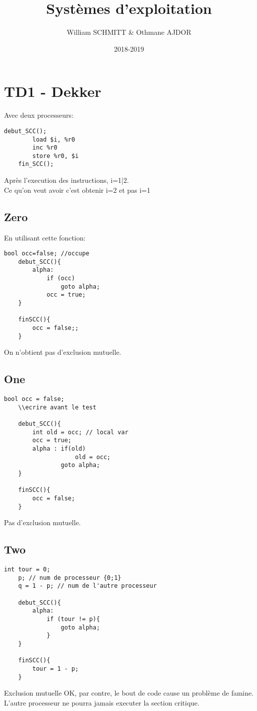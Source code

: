 \documentclass[11pt]{article}
\title{Systèmes d'exploitation}
\author{William SCHMITT \& Othmane AJDOR}
\date{2018-2019}
\begin{document}
\maketitle

\section{TD1 - Dekker}
Avec deux processeurs:
\begin{lstlisting}[frame=single]
	debut_SCC();
		load $i, %r0
		inc %r0
		store %r0, $i
	fin_SCC();
\end{lstlisting}
Après l'execution des instructions, i=1|2.\\
Ce qu'on veut avoir c'est obtenir i=2 et pas i=1

\subsection{Zero}
En utilisant cette fonction:
\begin{lstlisting}[frame=single]
	bool occ=false; //occupe
	debut_SCC(){
		alpha: 
			if (occ) 
				goto alpha; 
			occ = true;
	}

	finSCC(){
		occ = false;;
	}
\end{lstlisting}
On n'obtient pas d'exclusion mutuelle.

\pagebreak

\subsection{One}
\begin{lstlisting}[frame=single]
	bool occ = false;
	\\ecrire avant le test
	
	debut_SCC(){
		int old = occ; // local var
		occ = true;
		alpha : if(old)
					old = occ;
				goto alpha;
	}

	finSCC(){
		occ = false;
	}
\end{lstlisting}
Pas d'exclusion mutuelle.

\subsection{Two}
\begin{lstlisting}[frame=single]
	int tour = 0;
	p; // num de processeur {0;1}
	q = 1 - p; // num de l'autre processeur

	debut_SCC(){
		alpha:
			if (tour != p){
				goto alpha;
			}
	}

	finSCC(){
		tour = 1 - p;
	}
\end{lstlisting}
Exclusion mutuelle OK, par contre, le bout de code cause un problème de famine.\\
L'autre processeur ne pourra jamais executer la section critique.
\end{document}
